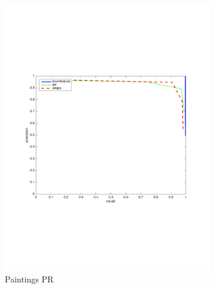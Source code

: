 \documentclass[english,12pt,a4paper,pdftex,elec,utf8, table]{aaltothesis}
\begin{document}
\begin{figure}[htb]
\begin{center}
\begin{subfigure}[b]{0.49\textwidth}
    \includegraphics[width=\textwidth]{figures/Shave10pxPR.pdf}
    \caption{Paintings PR}
    \label{Shaverocthinglink}
  \end{subfigure}
  \begin{subfigure}[b]{0.49\textwidth}

\end{subfigure}
\end{center}
\end{figure}
\end{document}
